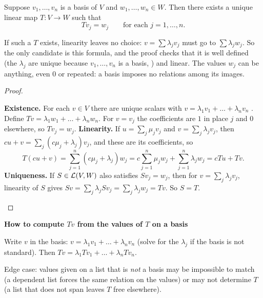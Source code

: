 \documentclass[10pt]{scrartcl}
\newenvironment{methodbox}[1]{\begin{mdframed}[style=methodstyle]\textbf{\color{NavyBlue}#1}\par\vspace{2pt}}{\end{mdframed}}
\begin{document}
\begin{theorem*}
  Suppose $v_1,\dots,v_n$ is a basis of $V$ and $w_1,\dots,w_n\in W$. Then there exists a unique linear map $T\colon V\to W$ such that
  \[
    Tv_j = w_j \qquad\text{for each }j=1,\dots,n.
  \]
\end{theorem*}
\begin{ideabox}
  If such a $T$ exists, linearity leaves no choice: $v=\sum\lambda_jv_j$ must go to $\sum\lambda_jw_j$. So the only candidate is this formula, and the proof checks that it is well defined (the $\lambda_j$ are unique because $v_1,\dots,v_n$ is a basis, ) and linear. The values $w_j$ can be anything, even $0$ or repeated: a basis imposes no relations among its images.
\end{ideabox}
\begin{proof}
  \begin{steps}
    \ii \textbf{Existence.} For each $v\in V$ there are unique scalars with $v=\lambda_1v_1+\dots+\lambda_nv_n$ . Define $Tv=\lambda_1w_1+\dots+\lambda_nw_n$. For $v=v_j$ the coefficients are $1$ in place $j$ and $0$ elsewhere, so $Tv_j=w_j$.
    \ii \textbf{Linearity.} If $u=\sum_j\mu_jv_j$ and $v=\sum_j\lambda_jv_j$, then $cu+v=\sum_j(c\mu_j+\lambda_j)v_j$, and these are its coefficients, so
    \[
      T(cu+v)=\sum_{j=1}^n(c\mu_j+\lambda_j)w_j=c\sum_{j=1}^n\mu_jw_j+\sum_{j=1}^n\lambda_jw_j=cTu+Tv.
    \]
    \ii \textbf{Uniqueness.} If $S\in\mathcal L(V,W)$ also satisfies $Sv_j=w_j$, then for $v=\sum_j\lambda_jv_j$, linearity of $S$ gives $Sv=\sum_j\lambda_jSv_j=\sum_j\lambda_jw_j=Tv$. So $S=T$.
  \end{steps}
\end{proof}

\begin{methodbox}{How to compute $Tv$ from the values of $T$ on a basis}
  \begin{steps}
    \ii Write $v$ in the basis: $v=\lambda_1v_1+\dots+\lambda_nv_n$ (solve for the $\lambda_j$ if the basis is not standard).
    \ii Then $Tv=\lambda_1Tv_1+\dots+\lambda_nTv_n$.
  \end{steps}
  Edge case: values given on a list that is \emph{not} a basis may be impossible to match (a dependent list forces the same relation on the values) or may not determine $T$ (a list that does not span leaves $T$ free elsewhere).
\end{methodbox}
\end{document}
